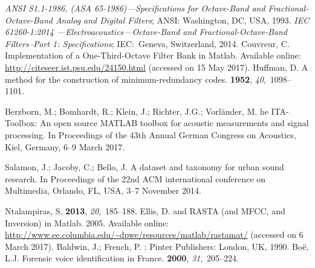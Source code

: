 \documentclass[sensors,article,accept,moreauthors,pdftex,10pt,a4paper]{mdpi}
\begin{document}
\begin{thebibliography}{999}
\emph{ANSI S1.1-1986, (ASA 65-1986)---Specifications for Octave-Band and
  Fractional-Octave-Band Analog and Digital Filters}; {ANSI: Washington, DC, USA,}  1993.
\emph{IEC 61260-1:2014 ---Electroacoustics---Octave-Band and Fractional-Octave-Band
  Filters--Part 1: Specifications}; {IEC:~Geneva, Switzerland, }2014.
Couvreur, C.
\newblock Implementation of a One-Third-Octave Filter Bank in Matlab.
\newblock Available online: \mbox{\url{http://citeseer.ist.psu.edu/24150.html}} ({accessed on} {15 May 2017}).
Huffman, D.
\newblock A method for the construction of minimum-redundancy codes.
 {\bf 1952}, {\em 40},~1098--1101.

Berzborn, M.; Bomhardt, R.; Klein, J.; Richter, J.G.; Vorländer, M.
he {ITA}-{T}oolbox: {A}n {o}pen {s}ource {MATLAB} {t}oolbox for
  {a}coustic {m}easurements and {s}ignal {p}rocessing.
\newblock In Proceedings of the 43th Annual German Congress on Acoustics, Kiel, Germany, 6--9 March 2017.

Salamon, J.; Jacoby, C.; Bello, J.
\newblock A dataset and taxonomy for urban sound research.
\newblock In Proceedings of the 22nd ACM international conference on Multimedia, {Orlando, FL, USA, 3--7 November }2014.

Ntalampiras, S.
 {\bf 2013}, {\em 20},~185--188.
Ellis, D.
 and {RASTA} (and {MFCC}, and Inversion) in {M}atlab. 2005.
\newblock Available online: \url{http://www.ee.columbia.edu/~dpwe/resources/matlab/rastamat/} ({accessed on} {6 March 2017}).
Baldwin, J.; French, P.
; Pinter Publishers: {London, }{UK}, 1990.
Bo{\"e}, L.J.
\newblock Forensic voice identification in France.
 {\bf 2000}, {\em 31},~205--224.


\end{thebibliography}
\end{document}
